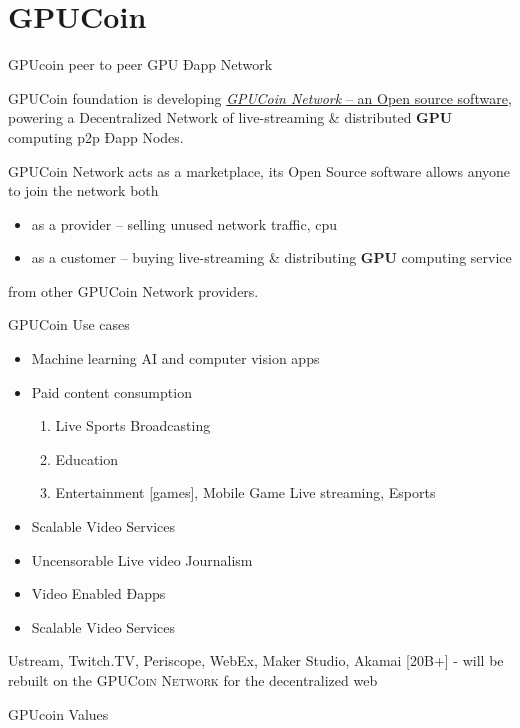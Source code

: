 \documentclass[10pt]{beamer}
\begin{document}
\section{GPUCoin}
\begin{frame}[fragile]{ GPUcoin peer to peer GPU Ðapp Network }

 GPUCoin foundation is developing \href{http://gpuco.in/}{\emph{GPUCoin Network} – an Open source software}, powering a Decentralized Network of live-streaming \& distributed \textbf{GPU} computing p2p Ðapp Nodes.
 
\pause
GPUCoin Network acts as a marketplace, its Open Source software allows anyone to join the network both 

\begin{itemize}[<+-| alert@+>]
\item as a provider – selling unused network traffic, cpu
\item as a customer – buying live-streaming \& distributing \textbf{GPU} computing service
\end{itemize}
 from other GPUCoin Network providers. 
\end{frame}



\begin{frame}[fragile]{GPUCoin Use cases}
 \begin{itemize}[<+-| alert@+>]%
\item {Machine learning AI and computer vision apps} 
\item {Paid content consumption}
\begin{enumerate}[<+-| alert@+>]
\item Live Sports Broadcasting
\item Education 
\item Entertainment [games], Mobile Game Live streaming, Esports
\end{enumerate}
\item {Scalable Video Services}
\item {Uncensorable Live video Journalism}
\item {Video Enabled Ðapps}
\item {Scalable Video Services}

\end{itemize}
\pause

\Large{
Ustream, Twitch.TV, Periscope, WebEx, Maker Studio, Akamai [20B+] - will be rebuilt on the \textsc{GPUCoin Network} for the decentralized web
}

\end{frame}
\begin{frame}[t]{GPUcoin Values}

\end{frame}
\end{document}
